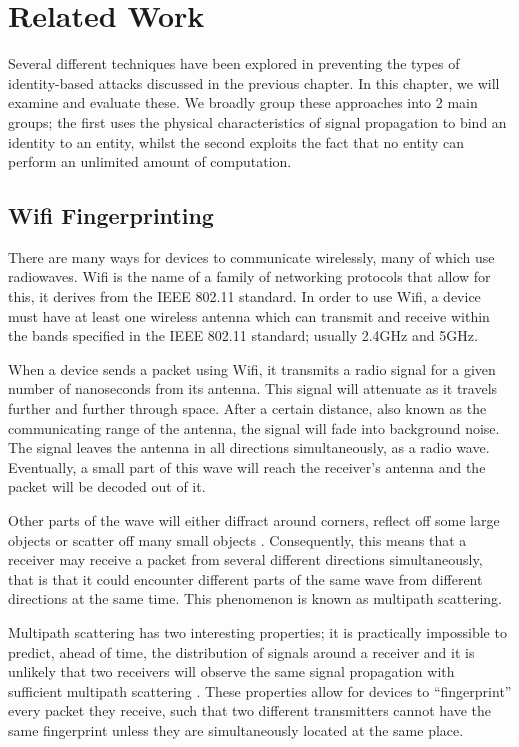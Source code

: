 \chapter{Related Work}

Several different techniques have been explored in preventing the types of identity-based attacks discussed in the previous chapter. In this chapter, we will examine and evaluate these. We broadly group these approaches into 2 main groups; the first uses the physical characteristics of signal propagation to bind an identity to an entity, whilst the second exploits the fact that no entity can perform an unlimited amount of computation.

\section{Wifi Fingerprinting}

There are many ways for devices to communicate wirelessly, many of which use radiowaves. Wifi is the name of a family of networking protocols that allow for this, it derives from the IEEE 802.11 standard. In order to use Wifi, a device must have at least one wireless antenna which can transmit and receive within the bands specified in the IEEE 802.11 standard; usually 2.4GHz and 5GHz.

When a device sends a packet using Wifi, it transmits a radio signal for a given number of nanoseconds from its antenna. This signal will attenuate as it travels further and further through space. After a certain distance, also known as the communicating range of the antenna, the signal will fade into background noise. The signal leaves the antenna in all directions simultaneously, as a radio wave. Eventually, a small part of this wave will reach the receiver's antenna and the packet will be decoded out of it.

Other parts of the wave will either diffract around corners, reflect off some large objects or scatter off many small objects \cite{SignalProp}. Consequently, this means that a receiver may receive a packet from several different directions simultaneously, that is that it could encounter different parts of the same wave from different directions at the same time. This phenomenon is known as multipath scattering. %

Multipath scattering has two interesting properties; it is practically impossible to predict, ahead of time, the distribution of signals around a receiver and it is unlikely that two receivers will observe the same signal propagation with sufficient multipath scattering \citationneeded. These properties allow for devices to ``fingerprint'' every packet they receive, such that two different transmitters cannot have the same fingerprint unless they are simultaneously located at the same place. 

